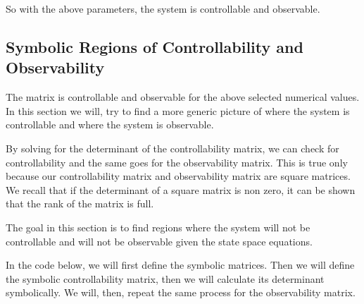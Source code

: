 \documentclass[11pt]{article}
\begin{document}
So with the above parameters, the system is controllable
and
observable.

\subsection{Symbolic Regions of Controllability and
Observability}\label{symbolic-regions-of-controllability-and-observability}

The matrix is controllable and observable for the above selected
numerical values. In this section we will, try to find a more generic
picture of where the system is controllable and where the system is
observable.

By solving for the determinant of the controllability matrix, we can
check for controllability and the same goes for the observability
matrix. This is true only because our controllability matrix and
observability matrix are square matrices. We recall that if the
determinant of a square matrix is non zero, it can be shown that the
rank of the matrix is full.

The goal in this section is to find regions where the system will not be
controllable and will not be observable given the state space equations.

In the code below, we will first define the symbolic matrices. Then we
will define the symbolic controllability matrix, then we will calculate
its determinant symbolically. We will, then, repeat the same process for
the observability matrix.
\end{document}
